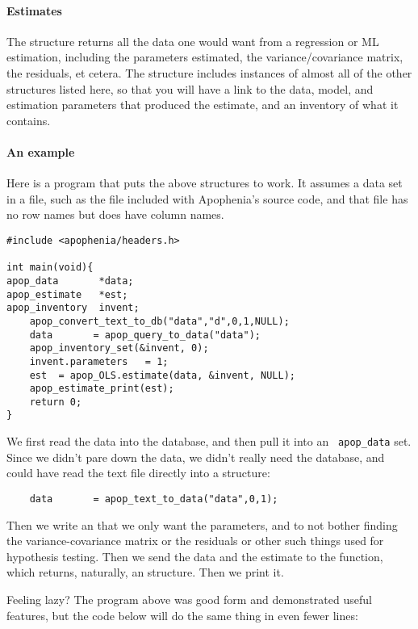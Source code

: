 \paragraph{Estimates}
The  structure returns all the data one would want
from a regression or ML estimation, including the parameters estimated,
the variance/covariance matrix, the residuals, et cetera. The structure
includes instances of almost all of the other structures listed here, so
that you will have a link to the data, model, and estimation parameters
that produced the estimate, and an inventory of what it contains.

\paragraph{An example}
Here is a program that puts the above structures to work.  It assumes a
data set in a file, such as the  file included with
Apophenia's source code, and that file has no row names but does have
column names.
\begin{lstlisting}
#include <apophenia/headers.h>

int main(void){
apop_data       *data;
apop_estimate   *est;
apop_inventory  invent;
    apop_convert_text_to_db("data","d",0,1,NULL);
    data       = apop_query_to_data("data");
    apop_inventory_set(&invent, 0);
    invent.parameters   = 1;
    est  = apop_OLS.estimate(data, &invent, NULL);
    apop_estimate_print(est);
    return 0;
}
\end{lstlisting}

We first read the data into the database, and then pull it into an {\tt
apop\_data} set. Since we didn't pare down the data, we didn't really
need the database, and could have read the text file directly into a
 structure:
\begin{lstlisting}
    data       = apop_text_to_data("data",0,1);
\end{lstlisting}
Then we write an  that we only want the
parameters, and to not bother finding the variance-covariance matrix or
the residuals or other such things used for hypothesis testing. Then we
send the data and the estimate to the 
function, which returns, naturally, an 
structure. Then we print it.

Feeling lazy? The program above was good form and demonstrated useful
features, but the code below will do the same thing in even fewer lines:

